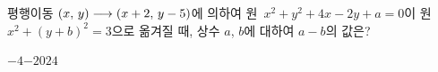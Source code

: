 평행이동 $(x,\mkern3mu y)\longrightarrow(x+2,\mkern3mu y-5)$에 의하여 원~$x^2+y^2+4x-2y+a=0$이 원~$x^2+(y+b)^2=3$으로 옮겨질 때, 상수 $a$, $b$에 대하여 $a-b$의 값은?
\begin{choices32}{$-4$}{$-2$}{$0$}{$2$}{$4$}\end{choices32}

